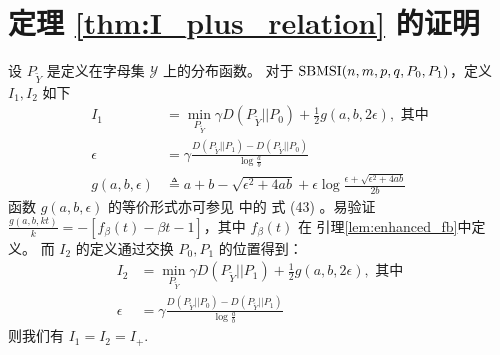 \section{定理 \ref{thm:I_plus_relation} 的证明}
	\begin{lemma}\label{lem:p0p12}
        设 $P_{\widetilde{Y}}$ 是定义在字母集
        $\mathcal{Y}$ 上的分布函数。
		对于 $\operatorname{SBMSI}(n,m,p,q,P_0,P_1)$，定义
        $I_1, I_2$ 如下
		\begin{align}
			I_1 &=\min_{P_{\widetilde{Y}}} \gamma D(P_{\widetilde{Y}}|| P_0)+ \frac{1}{2} g(a,b, 2\epsilon),
            \text{ 其中}\nonumber\\
			\epsilon &= \gamma \frac{D(P_{\widetilde{Y}} || P_1) - D(P_{\widetilde{Y}} || P_0) }{\log \frac{a}{b}}\label{eq:I1}\\
	   g(a,b,\epsilon) &\triangleq a + b - \sqrt{\epsilon^2 + 4ab} + \epsilon \log \frac{\epsilon + \sqrt{\epsilon^2 + 4ab}}{2b}
       \label{equation:g}
		\end{align}
        函数 $g(a,b,\epsilon)$ 的等价形式亦可参见 \citet{abbe2015exact} 中的 式 (43)
        。易验证 $\frac{g(a,b,kt)}{k}=-[f_{\beta}(t)-\beta t -1]$，其中 $f_{\beta}(t)$ 在 引理\ref{lem:enhanced_fb}中定义。
        而 $I_2$ 的定义通过交换 $P_0, P_1$ 的位置得到：
		\begin{align}
			I_2 & = \min_{P_{\widetilde{Y}}} \gamma D(P_{\widetilde{Y}}|| P_1)+ \frac{1}{2} g(a,b, 2\epsilon),
            \text{ 其中}\nonumber\\
			\epsilon &= \gamma \frac{D(P_{\widetilde{Y}} || P_0) - D(P_{\widetilde{Y}} || P_1) }{\log \frac{a}{b}}
            \label{eq:I2}
		\end{align}
 		则我们有 $I_1=I_2=I_+$. 
    \end{lemma}
